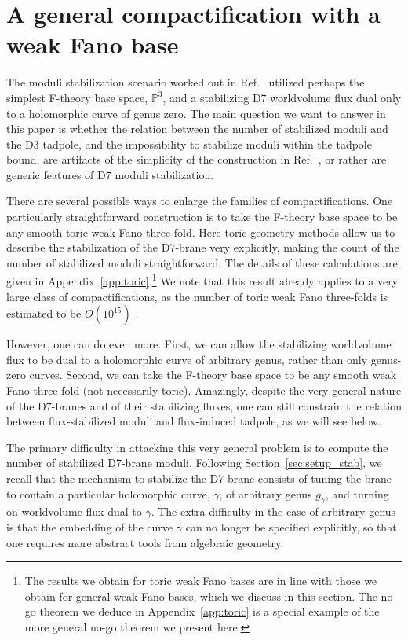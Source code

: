 \documentclass[a4paper,12pt]{article}
\numberwithin{equation}{section}
\newcommand{\mbb}{\mathbb}
\newcommand{\crv}{\gamma}			%
\begin{document}
\section{A general compactification with a weak Fano base}
\label{sec:gen}

The moduli stabilization scenario worked out in Ref.~\cite{Collinucci:2008pf} utilized perhaps the simplest F-theory base space, $\mbb{P}^3$, and a stabilizing D7 worldvolume flux dual only to a holomorphic curve of genus zero. The main question we want to answer in this paper is whether the relation between the number of stabilized moduli and the D3 tadpole, and the impossibility to stabilize moduli within the tadpole bound, are artifacts of the simplicity of the construction in Ref.~\cite{Collinucci:2008pf}, or rather are generic features of D7 moduli stabilization.

There are several possible ways to enlarge the families of compactifications. One particularly straightforward construction is to take the F-theory base space to be any smooth toric weak Fano three-fold. Here toric geometry methods allow us to describe the stabilization of the D7-brane very explicitly, making the count of the number of stabilized moduli straightforward. The details of these calculations are given in Appendix~\ref{app:toric}.\footnote{The results we obtain for toric weak Fano bases are in line with those we obtain for general weak Fano bases, which we discuss in this section. The no-go theorem we deduce in Appendix~\ref{app:toric} is a special example of the more general no-go theorem we present here.} We note that this result already applies to a very large class of compactifications, as the number of toric weak Fano three-folds is estimated to be $O(10^{15})$ \cite{Halverson_2017}.

However, one can do even more.  First, we can allow the stabilizing worldvolume flux to be dual to a holomorphic curve of arbitrary genus, rather than only genus-zero curves. Second, we can take the F-theory base space to be any smooth weak Fano three-fold (not necessarily toric). Amazingly, despite the very general nature of the D7-branes and of their stabilizing fluxes, one can still constrain the relation between flux-stabilized moduli and flux-induced tadpole, as we will see below.

The primary difficulty in attacking this very general problem is to compute the number of stabilized D7-brane moduli. Following Section~\ref{sec:setup_stab}, we recall that the mechanism to stabilize the D7-brane consists of tuning the brane to contain a particular holomorphic curve, $\crv$, of arbitrary genus $g_\crv$, and turning on worldvolume flux dual to $\crv$. The extra difficulty in the case of arbitrary genus is that the embedding of the curve $\crv$ can no longer be specified explicitly, so that one requires more abstract tools from algebraic geometry.
\end{document}

